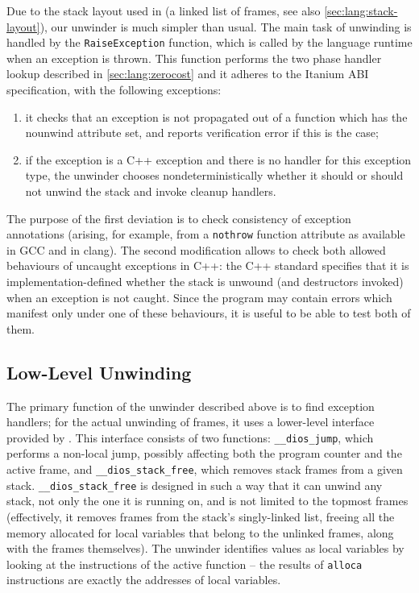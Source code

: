 Due to the stack layout used in \divm{} (a linked list of frames, see also
\autoref{sec:lang:stack-layout}), our unwinder is much simpler than
usual. The main task of unwinding is handled by the
\texttt{RaiseException} function, which is called by the language
runtime when an exception is thrown. This function performs the two
phase handler lookup described in \autoref{sec:lang:zerocost} and it
adheres to the Itanium ABI specification, with the following exceptions:

\begin{enumerate}
\def\labelenumi{\roman{enumi}.}
\item
  it checks that an exception is not propagated out of a function which
  has the nounwind attribute set, and reports verification error if this
  is the case;
\item
  if the exception is a C++ exception and there is no handler for this
  exception type, the unwinder chooses nondeterministically whether it
  should or should not unwind the stack and invoke cleanup handlers.
\end{enumerate}

The purpose of the first deviation is to check consistency of exception
annotations (arising, for example, from a \texttt{nothrow} function
attribute as available in GCC and in clang). The second modification
allows \divine{} to check both allowed behaviours of uncaught exceptions in
C++: the C++ standard specifies that it is implementation-defined
whether the stack is unwound (and destructors invoked) when an exception
is not caught.
Since the program may contain
errors which manifest only under one of these behaviours, it is useful
to be able to test both of them.

\subsection{Low-Level Unwinding}\label{sec:unwinder:ll}

The primary function of the unwinder described above is to find
exception handlers; for the actual unwinding of frames, it uses a
lower-level interface provided by \dios{}. This interface consists of two
functions: \texttt{\_\_dios\_jump}, which performs a non-local jump,
possibly affecting both the program counter and the active frame, and
\texttt{\_\_dios\_stack\_free}, which removes stack frames from a given
stack. \texttt{\_\_dios\_stack\_free} is designed in such a way that it can
unwind any stack, not only the one it is running on, and is not limited
to the topmost frames (effectively, it removes frames from the stack's
singly-linked list, freeing all the memory allocated for local variables
that belong to the unlinked frames, along with the frames
themselves). The unwinder
identifies values as local variables by looking at the instructions of
the active function -- the results of \texttt{alloca} instructions are
exactly the addresses of local variables.

